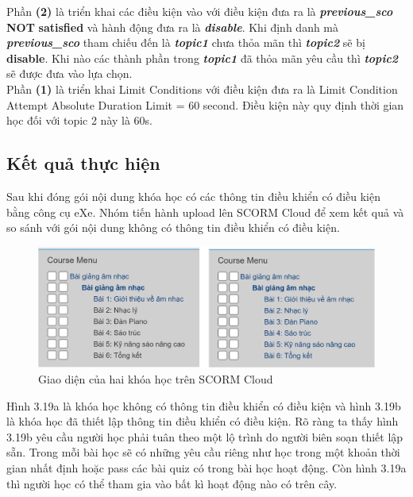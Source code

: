 Phần \textbf{(2)} là triển khai các điều kiện vào với điều kiện đưa ra là \textbf{\textit{previous\_sco}} \textbf{NOT} \textbf{satisfied} và hành động đưa ra là \textbf{\textit{disable}}. Khi định danh mà \textbf{\textit{previous\_sco}} tham chiếu đến là \textbf{\textit{topic1}} chưa thỏa mãn thì \textbf{\textit{topic2}} sẽ bị \textbf{disable}. Khi nào các thành phần trong \textbf{\textit{topic1}} đã thỏa mãn yêu cầu thì \textbf{\textit{topic2}} sẽ được đưa vào lựa chọn.\\

Phần \textbf{(1)} là triển khai Limit Conditions với điều kiện đưa ra là Limit Condition Attempt Absolute Duration Limit = 60 second. Điều kiện này quy định thời gian học đối với topic 2 này là 60s.



\subsection{Kết quả thực hiện}

Sau khi đóng gói nội dung khóa học có các thông tin điều khiển có điều kiện bằng công cụ eXe. Nhóm tiến hành upload lên SCORM Cloud để xem kết quả và so sánh với gói nội dung không có thông tin điều khiển có điều kiện.	
	
			\begin{center}
		\begin{figure}[htp]
			\begin{center}
				\includegraphics[width=15cm]{Chapter3/Pictures/picture319.png}
			\end{center}
			\caption{Giao diện của hai khóa học trên SCORM Cloud}
			\label{refpicture417}
		\end{figure}
	\end{center}
	
	Hình 3.19a là khóa học không có thông tin điều khiển có điều kiện và hình 3.19b là khóa học đã thiết lập thông tin điều khiển có điều kiện. Rõ ràng ta thấy hình 3.19b yêu cầu người học phải tuân theo một lộ trình do người biên soạn thiết lập sẵn. Trong mỗi bài học sẽ có những yêu cầu riêng như học trong một khoản thời gian nhất định hoặc pass các bài quiz có trong bài học hoạt động. Còn hình 3.19a thì người học có thể tham gia vào bất kì hoạt động nào có trên cây.

